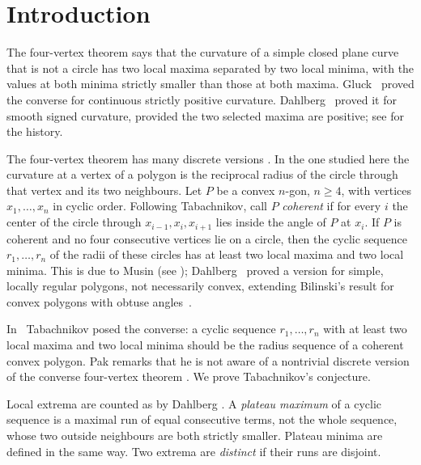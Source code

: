 \section{Introduction}\label{sec:intro}

The four-vertex theorem says that the curvature of a simple closed plane curve
that is not a circle has two local maxima separated by two local minima,
with the values at both minima strictly smaller than those at both maxima.
Gluck~\cite[pp.~295--296]{Gluck1971} proved the converse for continuous
strictly positive curvature. Dahlberg~\cite[Theorem~1.1]{Dahlberg2005}
proved it for smooth signed curvature, provided the two selected maxima
are positive; see \cite{DGPV2007} for the history.

The four-vertex theorem has many discrete versions
\cite{Musin2004,OvsienkoTabachnikov2001,Sedykh1997,Tabachnikov2000,Dahlberg2008,Pak2010}.
In the one studied here the curvature at a vertex of a polygon is the
reciprocal radius of the circle through that vertex and its two neighbours.
Let $P$ be a convex $n$-gon, $n\ge 4$, with vertices $x_1,\dots,x_n$ in cyclic
order. Following Tabachnikov, call $P$ \emph{coherent} if for every $i$ the
center of the circle through $x_{i-1},x_i,x_{i+1}$ lies inside the angle of
$P$ at $x_i$. If $P$ is coherent and no four consecutive vertices lie on a
circle, then the cyclic sequence $r_1,\dots,r_n$ of the radii of these circles
has at least two local maxima and two local minima. This is due to
Musin (see \cite{Tabachnikov2000,Musin2004}); Dahlberg~\cite{Dahlberg2008}
proved a version for simple, locally regular polygons, not necessarily convex,
extending Bilinski's result for convex polygons with obtuse angles~\cite{Bilinski1963}.

In~\cite[Problem~2]{Tabachnikov2008} Tabachnikov posed the converse: a cyclic
sequence $r_1,\dots,r_n$ with at least two local maxima and two local minima
should be the radius sequence of a coherent convex polygon. Pak remarks
that he is not aware of a nontrivial discrete version of the converse
four-vertex theorem \cite[\S21.10, p.~206]{Pak2010}. We prove Tabachnikov's conjecture.

Local extrema are counted as by Dahlberg \cite{Dahlberg2008}. A
\emph{plateau maximum} of a cyclic sequence is a maximal run of equal
consecutive terms, not the whole sequence, whose two outside neighbours are
both strictly smaller. Plateau minima are defined in the same way. Two
extrema are \emph{distinct} if their runs are disjoint.

